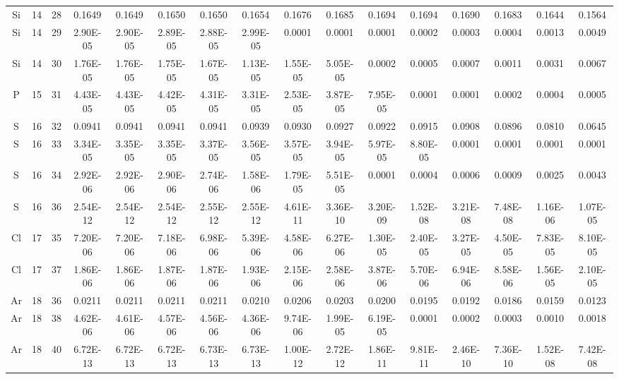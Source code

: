 {\begin{tabular}{|c|c|c|c|c|c|c|c|c|c|c|c|c|c|c|c|}
Si & 14 & 28   & 0.1649   & 0.1649   & 0.1650   & 0.1650   & 0.1654   & 0.1676   & 0.1685   & 0.1694   & 0.1694   & 0.1690   & 0.1683   & 0.1644   & 0.1564   \\
Si & 14 & 29   & 2.90E-05 & 2.90E-05 & 2.89E-05 & 2.88E-05 & 2.99E-05 & 0.0001   & 0.0001   & 0.0001   & 0.0002   & 0.0003   & 0.0004   & 0.0013   & 0.0049   \\
Si & 14 & 30   & 1.76E-05 & 1.76E-05 & 1.75E-05 & 1.67E-05 & 1.13E-05 & 1.55E-05 & 5.05E-05 & 0.0002   & 0.0005   & 0.0007   & 0.0011   & 0.0031   & 0.0067   \\
P  & 15 & 31   & 4.43E-05 & 4.43E-05 & 4.42E-05 & 4.31E-05 & 3.31E-05 & 2.53E-05 & 3.87E-05 & 7.95E-05 & 0.0001   & 0.0001   & 0.0002   & 0.0004   & 0.0005   \\
S  & 16 & 32   & 0.0941   & 0.0941   & 0.0941   & 0.0941   & 0.0939   & 0.0930   & 0.0927   & 0.0922   & 0.0915   & 0.0908   & 0.0896   & 0.0810   & 0.0645   \\
S  & 16 & 33   & 3.34E-05 & 3.35E-05 & 3.35E-05 & 3.37E-05 & 3.56E-05 & 3.57E-05 & 3.94E-05 & 5.97E-05 & 8.80E-05 & 0.0001   & 0.0001   & 0.0001   & 0.0001   \\
S  & 16 & 34   & 2.92E-06 & 2.92E-06 & 2.90E-06 & 2.74E-06 & 1.58E-06 & 1.79E-05 & 5.51E-05 & 0.0001   & 0.0004   & 0.0006   & 0.0009   & 0.0025   & 0.0043   \\
S  & 16 & 36   & 2.54E-12 & 2.54E-12 & 2.54E-12 & 2.55E-12 & 2.55E-12 & 4.61E-11 & 3.36E-10 & 3.20E-09 & 1.52E-08 & 3.21E-08 & 7.48E-08 & 1.16E-06 & 1.07E-05 \\
Cl & 17 & 35   & 7.20E-06 & 7.20E-06 & 7.18E-06 & 6.98E-06 & 5.39E-06 & 4.58E-06 & 6.27E-06 & 1.30E-05 & 2.40E-05 & 3.27E-05 & 4.50E-05 & 7.83E-05 & 8.10E-05 \\
Cl & 17 & 37   & 1.86E-06 & 1.86E-06 & 1.87E-06 & 1.87E-06 & 1.93E-06 & 2.15E-06 & 2.58E-06 & 3.87E-06 & 5.70E-06 & 6.94E-06 & 8.58E-06 & 1.56E-05 & 2.10E-05 \\
Ar & 18 & 36   & 0.0211   & 0.0211   & 0.0211   & 0.0211   & 0.0210   & 0.0206   & 0.0203   & 0.0200   & 0.0195   & 0.0192   & 0.0186   & 0.0159   & 0.0123   \\
Ar & 18 & 38   & 4.62E-06 & 4.61E-06 & 4.57E-06 & 4.56E-06 & 4.36E-06 & 9.74E-06 & 1.99E-05 & 6.19E-05 & 0.0001   & 0.0002   & 0.0003   & 0.0010   & 0.0018   \\
Ar & 18 & 40   & 6.72E-13 & 6.72E-13 & 6.72E-13 & 6.73E-13 & 6.73E-13 & 1.00E-12 & 2.72E-12 & 1.86E-11 & 9.81E-11 & 2.46E-10 & 7.36E-10 & 1.52E-08 & 7.42E-08 \\

\end{tabular}}
